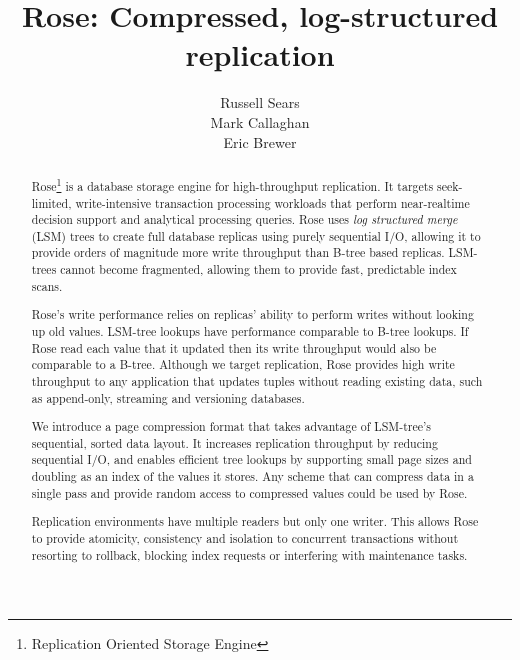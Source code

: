 \documentclass{vldb}
\newcommand{\rows}{Rose\xspace}
\newcommand{\rowss}{Rose's\xspace}
\begin{document}
\title{{\ttlit \rows}: Compressed, log-structured replication}
%
%
\author{
\alignauthor
Russell Sears\\
\alignauthor
Mark Callaghan\\
\alignauthor
Eric Brewer\\
}
\maketitle
\begin{abstract}
\rows\footnote{Replication Oriented Storage
  Engine} is a database storage engine for high-throughput
replication. It targets seek-limited,
write-intensive transaction processing workloads that perform
near-realtime decision support and analytical processing queries.
\rows uses {\em log structured merge} (LSM) trees to create full
database replicas using purely sequential I/O, allowing it to provide
orders of magnitude more write throughput than B-tree based replicas.
LSM-trees cannot become fragmented, allowing them to provide fast, predictable index scans.

\rowss write performance relies on replicas' ability to perform writes without
looking up old values.  LSM-tree lookups have
performance comparable to B-tree lookups.  If \rows read each value
that it updated then its write throughput would also be comparable
to a B-tree.
Although we target replication, \rows provides
high write throughput to any application that updates tuples
without reading existing data, such as append-only, streaming and
versioning databases.

We introduce a page compression
format that takes advantage of LSM-tree's sequential, sorted data
layout.  It increases replication throughput by reducing sequential
I/O, and enables efficient tree lookups by supporting small page sizes and doubling as an index of the
values it stores.  Any scheme that can
compress data in a single pass and provide random access to compressed
values could be used by \rows.

Replication environments have multiple readers but only one writer.
This allows \rows to provide atomicity, consistency and isolation to
concurrent transactions without resorting to rollback, blocking index
requests or interfering with maintenance tasks.


\end{abstract}
\end{document}
